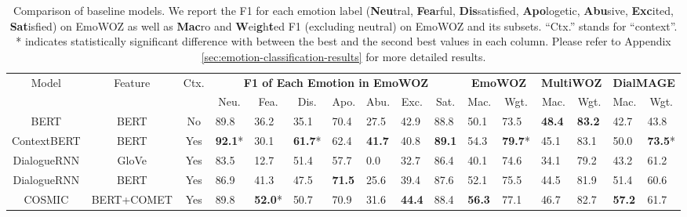 \documentclass[10pt, a4paper]{article}
\begin{document}
\begin{table*}[t]
\centering
\footnotesize
\setlength\tabcolsep{2.6pt}
\begin{tabular}{ccc|lllllll|ll|ll|ll}
\toprule[1pt]
 
\multirow{2}{*}{Model} & \multirow{2}{*}{Feature} & \multirow{2}{*}{Ctx.} & \multicolumn{7}{c|}{\textbf{F1 of Each Emotion in EmoWOZ}} & \multicolumn{2}{c|}{\textbf{EmoWOZ}} & \multicolumn{2}{c|}{\textbf{MultiWOZ}} & \multicolumn{2}{c}{\textbf{DialMAGE}} \\
 &  &  & \multicolumn{1}{c}{Neu.} & \multicolumn{1}{c}{Fea.} & \multicolumn{1}{c}{Dis.} & \multicolumn{1}{c}{Apo.} & \multicolumn{1}{c}{Abu.} & \multicolumn{1}{c}{Exc.} & \multicolumn{1}{c|}{Sat.} & \multicolumn{1}{c}{Mac.} & \multicolumn{1}{c|}{Wgt.} & \multicolumn{1}{c}{Mac.} & \multicolumn{1}{c|}{Wgt.} & \multicolumn{1}{c}{Mac.} & \multicolumn{1}{c}{Wgt.} \\ \hline
BERT & BERT & No & 89.8 & 36.2 & 35.1 & 70.4 & 27.5 & 42.9 & 88.8 & 50.1 & 73.5 & \textbf{48.4} & \textbf{83.2} & 42.7 & 43.8 \\
ContextBERT & BERT & Yes & \textbf{92.1}* & 30.1 & \textbf{61.7}* & 62.4 & \textbf{41.7} & 40.8 & \textbf{89.1} & 54.3 & \textbf{79.7}* & 45.1 & 83.1 & 50.0 & \textbf{73.5}* \\
DialogueRNN & GloVe & Yes & 83.5 & 12.7 & 51.4 & 57.7 & 0.0 & 32.7 & 86.4 & 40.1 & 74.6 & 34.1 & 79.2 & 43.2 & 61.2 \\
DialogueRNN & BERT & Yes & 86.9 & 41.3 & 47.5 & \textbf{71.5} & 25.6 & 39.4 & 87.6 & 52.1 & 75.5 & 44.5 & 81.9 & 51.4 & 60.6 \\
COSMIC & BERT+COMET & Yes & 89.8 & \textbf{52.0}* & 50.7 & 70.9 & 31.6 & \textbf{44.4} & 88.4 & \textbf{56.3} & 77.1 & 46.7 & 82.7 & \textbf{57.2} & 61.7 \\
\bottomrule[1pt]
\end{tabular}
\caption{Comparison of baseline models. We report the F1 for each emotion label (\textbf{Neu}tral, \textbf{Fea}rful, \textbf{Dis}satisfied, \textbf{Apo}logetic, \textbf{Abu}sive, \textbf{Exc}ited, \textbf{Sat}isfied) on EmoWOZ as well as \textbf{Mac}ro and \textbf{W}ei\textbf{g}h\textbf{t}ed F1 (excluding neutral) on EmoWOZ and its subsets. ``Ctx.'' stands for ``context''. * indicates statistically significant difference with  between the best and the second best values in each column. Please refer to Appendix \ref{sec:emotion-classification-results} for more detailed results. 
\label{tab:f1-scores}}
\vspace*{-3mm}
\end{table*}
\end{document}
